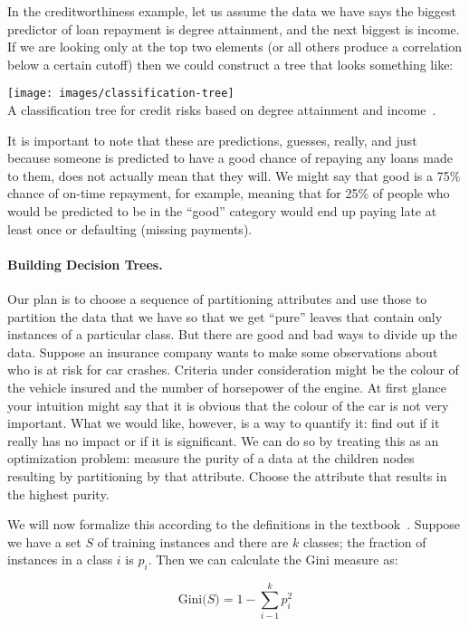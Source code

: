 \documentclass[a4paper]{report}
\begin{document}
In the creditworthiness example, let us assume the data we have says the biggest predictor of loan repayment is degree attainment, and the next biggest is income. If we are looking only at the top two elements (or all others produce a correlation below a certain cutoff) then we could construct a tree that looks something like:
\begin{center}
\texttt{[image: images/classification-tree]}\\
A classification tree for credit risks based on degree attainment and income~\cite{dsc}.
\end{center}

It is important to note that these are predictions, guesses, really, and just because someone is predicted to have a good chance of repaying any loans made to them, does not actually mean that they will. We might say that good is a 75\% chance of on-time repayment, for example, meaning that for 25\% of people who would be predicted to be in the ``good'' category would end up paying late at least once or defaulting (missing payments). 

\paragraph{Building Decision Trees.}
Our plan is to choose a sequence of partitioning attributes and use those to partition the data that we have so that we get ``pure'' leaves that contain only instances of a particular class. But there are good and bad ways to divide up the data. Suppose an insurance company wants to make some observations about who is at risk for car crashes. Criteria under consideration might be the colour of the vehicle insured and the number of horsepower of the engine. At first glance your intuition might say that it is obvious that the colour of the car is not very important. What we would like, however, is a way to quantify it: find out if it really has no impact or if it is significant. We can do so by treating this as an optimization problem: measure the purity of a data at the children nodes resulting by partitioning by that attribute. Choose the attribute that results in the highest purity.

We will now formalize this according to the definitions in the textbook~\cite{dsc}. Suppose we have a set $S$ of training instances and there are $k$ classes; the fraction of instances in a class $i$ is $p_{i}$. Then we can calculate the Gini measure as:


$$\mbox{Gini($S$)} = 1 - \sum_{i-1}^{k}p_{i}^{2}$$
\end{document}
